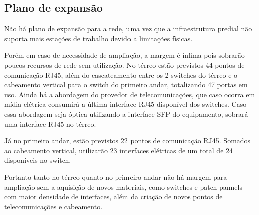 \documentclass[	DIV=calc,%
							paper=a4,%
							fontsize=12pt,%
							onecolumn]{scrartcl}	 					%
\begin{document}

\subsection{Plano de expansão}
Não há plano de expansão para a rede, uma vez que a infraestrutura predial não suporta mais estações de trabalho devido a limitações físicas.\par
Porém em caso de necessidade de ampliação, a margem é ínfima pois sobrarão poucos recursos de rede sem utilização. No térreo estão previstos 44 pontos de comunicação RJ45, além do cascateamento entre os 2 switches do térreo e o cabeamento vertical para o switch do primeiro andar, totalizando 47 portas em uso. Ainda há a abordagem do provedor de telecomunicações, que caso ocorra em mídia elétrica consumirá a última interface RJ45 disponível dos switches. Caso essa abordagem seja óptica utilizando a interface SFP do equipamento, sobrará uma interface RJ45 no térreo.\par
Já no primeiro andar, estão previstos 22 pontos de comunicação RJ45.  Somados ao cabeamento vertical, utilizarão 23 interfaces elétricas de um total de 24 disponíveis no switch.\par
Portanto tanto no térreo quanto no primeiro andar não há margem para ampliação sem a aquisição de novos materiais, como switches e patch pannels com maior densidade de interfaces, além da criação de novos pontos de telecomunicações e cabeamento.
\end{document}
